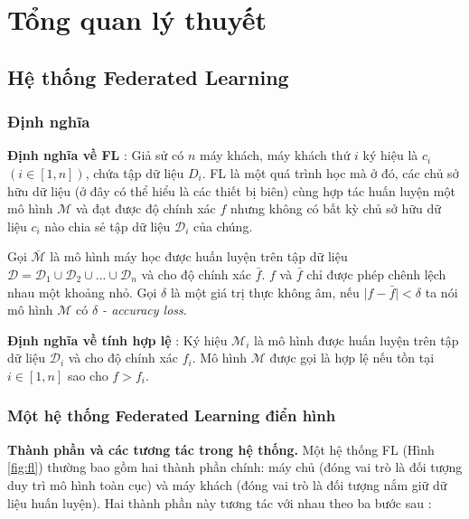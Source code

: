 \chapter{Tổng quan lý thuyết}
\label{Chapter2}

\section{Hệ thống Federated Learning}

\subsection{Định nghĩa}

\textbf{Định nghĩa về FL} \cite{yang2019federated}: Giả sử có $n$ máy khách, máy khách thứ $i$ ký hiệu là $c_i$ $(i\in [1, n])$, chứa tập dữ liệu $D_i$. FL là một quá trình học mà ở đó, các chủ sở hữu dữ liệu (ở đây có thể hiểu là các thiết bị biên) cùng hợp tác huấn luyện một mô hình $\mathcal{M}$ và đạt được độ chính xác $f$ nhưng không có bất kỳ chủ sở hữu dữ liệu $c_i$ nào chia sẻ tập dữ liệu $\mathcal{D}_i$ của chúng.

Gọi $\bar{\mathcal{M}}$ là mô hình máy học được huấn luyện trên tập dữ liệu $\mathcal{D}  = \mathcal{D}_1 \cup \mathcal{D}_2 \cup ... \cup \mathcal{D}_n$ và cho độ chính xác $\bar{f}$. $f$ và $\bar{f}$ chỉ được phép chênh lệch nhau một khoảng nhỏ. Gọi $\delta$ là một giá trị thực không âm, nếu $\mid f-\bar{f}\mid < \delta$ ta nói mô hình $\mathcal{M}$ có \textit{$\delta$ - accuracy loss}.

\textbf{Định nghĩa về tính hợp lệ} \cite{li2021survey}: Ký hiệu $\mathcal{M}_i$ là mô hình được huấn luyện trên tập dữ liệu $\mathcal{D}_i$ và cho độ chính xác $f_i$. Mô hình $\mathcal{M}$ được gọi là hợp lệ nếu tồn tại $i\in [1,n]$ sao cho $f>f_i$.

\subsection{Một hệ thống Federated Learning điển hình}

\textbf{Thành phần và các tương tác trong hệ thống.} Một hệ thống FL (Hình \ref{fig:fl}) thường bao gồm hai thành phần chính: máy chủ (đóng vai trò là đối tượng duy trì mô hình toàn cục) và máy khách (đóng vai trò là đối tượng nắm giữ dữ liệu huấn luyện). Hai thành phần này tương tác với nhau theo ba bước sau \cite{lim2020federated}:

